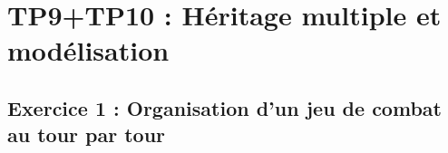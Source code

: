 \chapter{TP9+TP10 : Héritage multiple et modélisation}
        \section{Exercice 1 : Organisation d’un jeu de combat au tour par tour}
